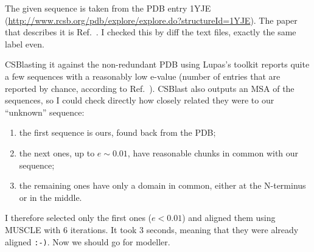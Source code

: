 \documentclass[12pt,a4paper,notitlepage,onecolumn]{article}
\title{\Title}
\author{\Author}
\date{\today}
\begin{document}
\maketitle

The given sequence is taken from the PDB entry 1YJE (\url{http://www.rcsb.org/pdb/explore/explore.do?structureId=1YJE}). The paper that describes it is Ref.~\cite{flaig_structural_2005}. I checked this by diff the text files, exactly the same label even.

CSBlasting it against the non-redundant PDB using Lupas's toolkit reports quite a few sequences with a reasonably low e-value (number of entries that are reported by chance, according to Ref.~\cite{karlin_methods_1990}). CSBlast also outputs an MSA of the sequences, so I could check directly how closely related they were to our ``unknown'' sequence:
\begin{enumerate}
 \item the first sequence is ours, found back from the PDB;
 \item the next ones, up to $e\sim 0.01$, have reasonable chunks in common with our sequence;
 \item the remaining ones have only a domain in common, either at the N-terminus or in the middle.
\end{enumerate}

I therefore selected only the first ones ($e < 0.01$) and aligned them using MUSCLE with 6 iterations. It took 3 seconds, meaning that they were already aligned \texttt{:-)}. Now we should go for modeller.



\end{document}
